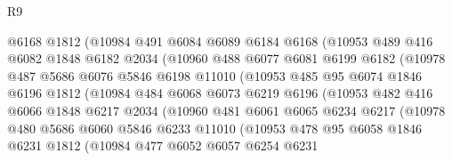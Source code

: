 \begin{lexlean}{R9}
\begin{coremodule}
                  @6168
                  @1812
                  (@10984
                    @491
                    @6084
                    @6089
                    @6184
                    @6168
                    (@10953
                      @489
                      @416
                      @6082
                      @1848
                      @6182
                      @2034
                      (@10960
                        @488
                        @6077
                        @6081
                        @6199
                        @6182
                        (@10978
                          @487
                          @5686
                          @6076
                          @5846
                          @6198
                          @11010
                          (@10953
                            @485
                            @95
                            @6074
                            @1846
                            @6196
                            @1812
                            (@10984
                              @484
                              @6068
                              @6073
                              @6219
                              @6196
                              (@10953
                                @482
                                @416
                                @6066
                                @1848
                                @6217
                                @2034
                                (@10960
                                  @481
                                  @6061
                                  @6065
                                  @6234
                                  @6217
                                  (@10978
                                    @480
                                    @5686
                                    @6060
                                    @5846
                                    @6233
                                    @11010
                                    (@10953
                                      @478
                                      @95
                                      @6058
                                      @1846
                                      @6231
                                      @1812
                                      (@10984
                                        @477
                                        @6052
                                        @6057
                                        @6254
                                        @6231

\end{coremodule}
\end{lexlean}
